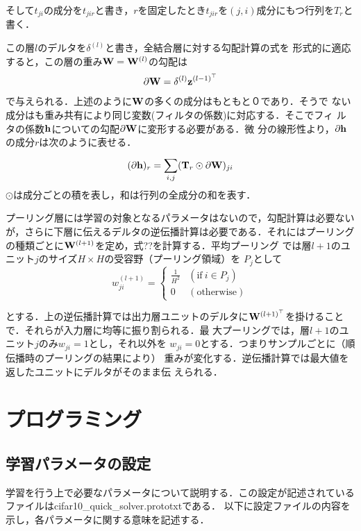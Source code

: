 \documentclass[a4paper,10pt]{jsarticle}
\begin{document}
そして$t_{ji}$の成分を$t_{jir}$と書き，$r$を固定したとき$t_{jir}$を$(j,i)$成分にもつ行列を$T_r$と書く．

この層$l$のデルタを$\delta^{(l)}$と書き，全結合層に対する勾配計算の式を
形式的に適応すると，この層の重み${\bf W}={\bf W}^{(l)}$の勾配は
%
\begin{equation}
 \partial{\bf W}= {\bf \delta}^{(l)}{\bf z}^{{(l-1)}^\top}
\end{equation}
%
で与えられる．上述のように${\bf W}$の多くの成分はもともと０であり．そうで
ない成分はも重み共有により同じ変数(フィルタの係数)に対応する．そこでフィ
ルタの係数$\bf{h}$についての勾配$\partial{\bf W}$に変形する必要がある．微
分の線形性より，$\partial\bf{h}$の成分$r$は次のように表せる．
%
\begin{equation}
 (\partial{\bf h})_r =\sum_{i,j}^{}({\bf T}_r\odot\partial{\bf W})_{ji}
\end{equation}
%
$\odot$は成分ごとの積を表し，和は行列の全成分の和を表す．

プーリング層には学習の対象となるパラメータはないので，勾配計算は必要ない
が，さらに下層に伝えるデルタの逆伝播計算は必要である．それにはプーリング
の種類ごとに${\bf W}^{(l+1)}$を定め，式??を計算する．平均プーリング
では層$l+1$のユニット$j$のサイズ$H \times H$の受容野（プーリング領域）を
$P_{j}$として
%
\begin{equation}
 w_{ji}^{(l+1)} =
	\begin{cases}
    \frac{1}{H^2} & (\text {if}  \  i\in{P_j}) \\
    0 & (\text{otherwise})
  \end{cases}
\end{equation}

とする．上の逆伝播計算では出力層ユニットのデルタに${\bf
W}^{(l+1)^{\top}}$を掛けることで．それらが入力層に均等に振り割られる．最
大プーリングでは，層$l+1$のユニット$j$のみ$w_{ji}=1$とし，それ以外を
$w_{ji}=0$とする．つまりサンプルごとに（順伝播時のプーリングの結果により）
重みが変化する．逆伝播計算では最大値を返したユニットにデルタがそのまま伝
えられる．


\section{プログラミング}
\subsection{学習パラメータの設定}
学習を行う上で必要なパラメータについて説明する．この設定が記述されているファイルはcifar10\_quick\_solver.prototxtである．
以下に設定ファイルの内容を示し，各パラメータに関する意味を記述する．
\end{document}
